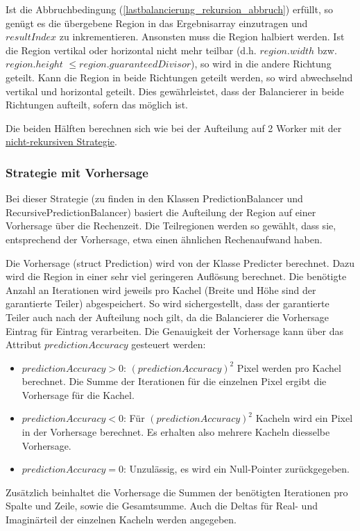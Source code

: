 Ist die Abbruchbedingung (\ref{lastbalancierung_rekursion_abbruch}) erfüllt, so genügt es die übergebene Region in das Ergebnisarray einzutragen und $resultIndex$ zu inkrementieren.
Ansonsten muss die Region halbiert werden. Ist die Region vertikal oder horizontal nicht mehr teilbar (d.h. $region.width$ bzw. $region.height$ $\leq region.guaranteedDivisor$), so wird in die andere Richtung geteilt.
Kann die Region in beide Richtungen geteilt werden, so wird abwechselnd vertikal und horizontal geteilt. Dies gewährleistet, dass der Balancierer in beide Richtungen aufteilt, sofern das möglich ist.

Die beiden Hälften berechnen sich wie bei der Aufteilung auf 2 Worker mit der \hyperref[lastbalancierung_naiv]{nicht-rekursiven Strategie}.

\subsubsection{Strategie mit Vorhersage}

Bei dieser Strategie (zu finden in den Klassen PredictionBalancer und RecursivePredictionBalancer) basiert die Aufteilung der Region auf einer Vorhersage über die Rechenzeit.
Die Teilregionen werden so gewählt, dass sie, entsprechend der Vorhersage, etwa einen ähnlichen Rechenaufwand haben.

Die Vorhersage (struct Prediction) wird von der Klasse Predicter berechnet.
Dazu wird die Region in einer sehr viel geringeren Auflösung berechnet.
Die benötigte Anzahl an Iterationen wird jeweils pro Kachel (Breite und Höhe sind der garantierte Teiler) abgespeichert.
So wird sichergestellt, dass der garantierte Teiler auch nach der Aufteilung noch gilt, da die Balancierer die Vorhersage Eintrag für Eintrag verarbeiten.
Die Genauigkeit der Vorhersage kann über das Attribut $predictionAccuracy$ gesteuert werden:
\begin{itemize}
	\item $predictionAccuracy > 0$: $(predictionAccuracy)^2$ Pixel werden pro Kachel berechnet. Die Summe der Iterationen für die einzelnen Pixel ergibt die Vorhersage für die Kachel.
	\item $predictionAccuracy < 0$: Für $(predictionAccuracy)^2$ Kacheln wird ein Pixel in der Vorhersage berechnet. Es erhalten also mehrere Kacheln diesselbe Vorhersage.
	\item $predictionAccuracy = 0$: Unzulässig, es wird ein Null-Pointer zurückgegeben.
\end{itemize}
Zusätzlich beinhaltet die Vorhersage die Summen der benötigten Iterationen pro Spalte und Zeile, sowie die Gesamtsumme.
Auch die Deltas für Real- und Imaginärteil der einzelnen Kacheln werden angegeben.


